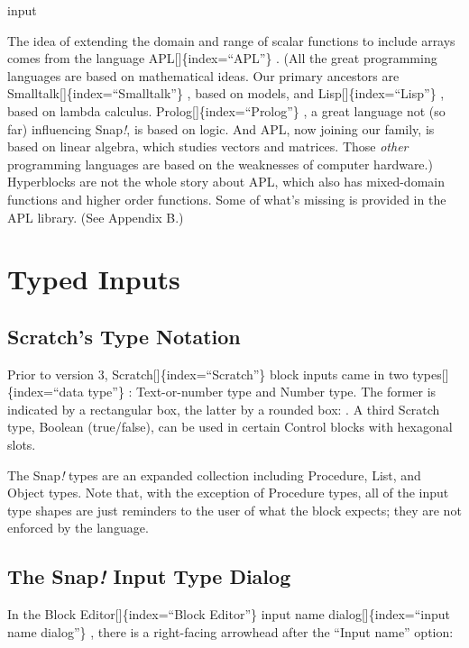 \documentclass[
  letterpaper,
]{book}
\begin{document}
input

The idea of extending the domain and range of scalar functions to
include arrays comes from the language APL{[}{]}\{index=``APL''\} . (All
the great programming languages are based on mathematical ideas. Our
primary ancestors are Smalltalk{[}{]}\{index=``Smalltalk''\} , based on
models, and Lisp{[}{]}\{index=``Lisp''\} , based on lambda calculus.
Prolog{[}{]}\{index=``Prolog''\} , a great language not (so far)
influencing Snap\emph{!}, is based on logic. And APL, now joining our
family, is based on linear algebra, which studies vectors and matrices.
Those \emph{other} programming languages are based on the weaknesses of
computer hardware.) Hyperblocks are not the whole story about APL, which
also has mixed-domain functions and higher order functions. Some of
what's missing is provided in the APL library. (See Appendix B.)


\chapter{Typed Inputs}\label{typed-inputs}

\section{Scratch's Type Notation}\label{scratchs-type-notation}

Prior to version 3, Scratch{[}{]}\{index=``Scratch''\} block inputs came
in two types{[}{]}\{index=``data type''\} : Text-or-number type and
Number type. The former is indicated by a rectangular box, the latter by
a rounded box: . A third Scratch type, Boolean (true/false), can be used
in certain Control blocks with hexagonal slots.

The Snap\emph{!} types are an expanded collection including Procedure,
List, and Object types. Note that, with the exception of Procedure
types, all of the input type shapes are just reminders to the user of
what the block expects; they are not enforced by the language.

\section{\texorpdfstring{The Snap\emph{!} Input Type
Dialog}{The Snap! Input Type Dialog}}\label{the-snap-input-type-dialog}

In the Block Editor{[}{]}\{index=``Block Editor''\} input name
dialog{[}{]}\{index=``input name dialog''\} , there is a right-facing
arrowhead after the ``Input name'' option:
\end{document}
